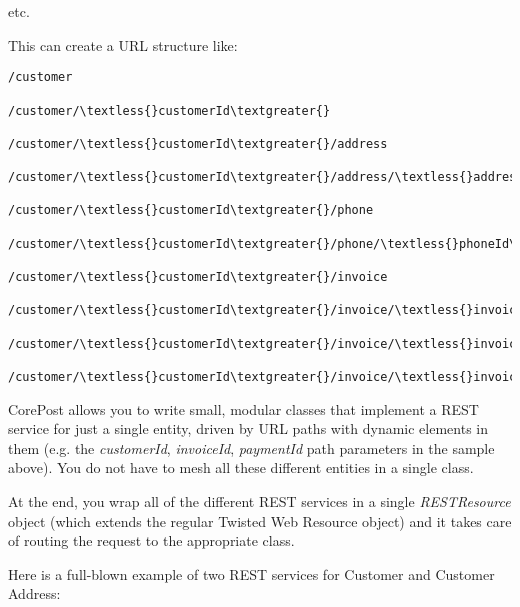 \documentclass[letterpaper,10pt,english]{sphinxmanual}
\begin{document}
etc.

This can create a URL structure like:

\begin{Verbatim}[commandchars=\\\{\}]
/customer

/customer/\textless{}customerId\textgreater{}

/customer/\textless{}customerId\textgreater{}/address

/customer/\textless{}customerId\textgreater{}/address/\textless{}addressId\textgreater{}

/customer/\textless{}customerId\textgreater{}/phone

/customer/\textless{}customerId\textgreater{}/phone/\textless{}phoneId\textgreater{}

/customer/\textless{}customerId\textgreater{}/invoice

/customer/\textless{}customerId\textgreater{}/invoice/\textless{}invoiceId\textgreater{}

/customer/\textless{}customerId\textgreater{}/invoice/\textless{}invoiceId\textgreater{}/payment

/customer/\textless{}customerId\textgreater{}/invoice/\textless{}invoiceId\textgreater{}/payment/\textless{}paymentId\textgreater{}
\end{Verbatim}

CorePost allows you to write small, modular classes that implement a REST service for just a single entity,
driven by URL paths with dynamic elements in them (e.g. the \emph{customerId}, \emph{invoiceId}, \emph{paymentId} path parameters in the sample above).
You do not have to mesh all these different entities in a single class.

At the end, you wrap all of the different REST services in a single \emph{RESTResource} object (which extends the regular Twisted Web Resource object)
and it takes care of routing the request to the appropriate class.

Here is a full-blown example of two REST services for Customer and Customer Address:
\end{document}
